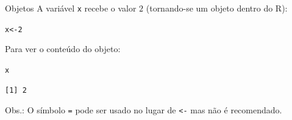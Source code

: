 \documentclass[10pt,handout]{beamer}\usepackage[]{graphicx}\usepackage[]{color}
\makeatletter
\newcommand{\hlnum}[1]{\textcolor[rgb]{0.686,0.059,0.569}{#1}}%
\newcommand{\hlstd}[1]{\textcolor[rgb]{0.345,0.345,0.345}{#1}}%
\newcommand{\hlkwb}[1]{\textcolor[rgb]{0.69,0.353,0.396}{#1}}%
\newenvironment{kframe}{%
 \def\at@end@of@kframe{}%
 \ifinner\ifhmode%
  \def\at@end@of@kframe{\end{minipage}}%
  \begin{minipage}{\columnwidth}%
 \fi\fi%
 \def\FrameCommand##1{\hskip\@totalleftmargin \hskip-\fboxsep
 \colorbox{shadecolor}{##1}\hskip-\fboxsep
     \hskip-\linewidth \hskip-\@totalleftmargin \hskip\columnwidth}%
 \MakeFramed {\advance\hsize-\width
   \@totalleftmargin\z@ \linewidth\hsize
   \@setminipage}}%
 {\par\unskip\endMakeFramed%
 \at@end@of@kframe}
\newenvironment{knitrout}{}{} %
\makeatother
\begin{document}
\begin{frame}[fragile]{Objetos}
A variável \texttt{x} recebe o valor $2$ (tornando-se um objeto dentro do R):
\begin{knitrout}\small
{}\color{fgcolor}\begin{kframe}
\begin{alltt}
\hlstd{x} \hlkwb{<-} \hlnum{2}
\end{alltt}
\end{kframe}
\end{knitrout}
\begin{center}
\end{center}
Para ver o conteúdo do objeto:
\begin{knitrout}\small
{}\color{fgcolor}\begin{kframe}
\begin{alltt}
\hlstd{x}
\end{alltt}
\begin{verbatim}
[1] 2
\end{verbatim}
\end{kframe}
\end{knitrout}
Obs.: O símbolo \verb|=| pode ser usado no lugar de \verb|<-| mas não é
recomendado.
\end{frame}
\end{document}
